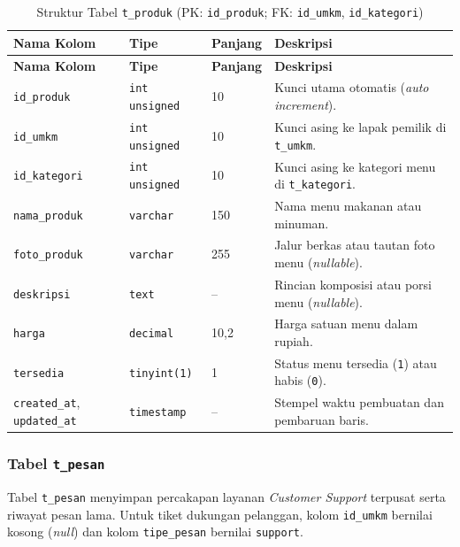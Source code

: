 \renewcommand{\arraystretch}{1.20}
\begin{longtable}{|L{3.85cm}|L{2.4cm}|C{1.65cm}|L{\dimexpr\textwidth-3.85cm-2.4cm-1.65cm-8\arrayrulewidth\relax}|}
\caption{Struktur Tabel \texttt{t\_produk} (PK: \texttt{id\_produk}; FK: \texttt{id\_umkm}, \texttt{id\_kategori})}
\label{tab:skema-produk} \\
\hline
{}
\textbf{Nama Kolom} & \textbf{Tipe} & \textbf{Panjang} & \textbf{Deskripsi} \\
\hline
\endfirsthead
\hline
{}
\textbf{Nama Kolom} & \textbf{Tipe} & \textbf{Panjang} & \textbf{Deskripsi} \\
\hline
\endhead
\hline
\endfoot
\texttt{id\_produk} & \texttt{int unsigned} & 10 & Kunci utama otomatis (\textit{auto increment}). \\
\hline
\texttt{id\_umkm} & \texttt{int unsigned} & 10 & Kunci asing ke lapak pemilik di \texttt{t\_umkm}. \\
\hline
\texttt{id\_kategori} & \texttt{int unsigned} & 10 & Kunci asing ke kategori menu di \texttt{t\_kategori}. \\
\hline
\texttt{nama\_produk} & \texttt{varchar} & 150 & Nama menu makanan atau minuman. \\
\hline
\texttt{foto\_produk} & \texttt{varchar} & 255 & Jalur berkas atau tautan foto menu (\textit{nullable}). \\
\hline
\texttt{deskripsi} & \texttt{text} & -- & Rincian komposisi atau porsi menu (\textit{nullable}). \\
\hline
\texttt{harga} & \texttt{decimal} & 10,2 & Harga satuan menu dalam rupiah. \\
\hline
\texttt{tersedia} & \texttt{tinyint(1)} & 1 & Status menu tersedia (\texttt{1}) atau habis (\texttt{0}). \\
\hline
\texttt{created\_at}, \texttt{updated\_at} & \texttt{timestamp} & -- & Stempel waktu pembuatan dan pembaruan baris. \\
\hline
\end{longtable}

\subsubsection{Tabel \texttt{t\_pesan}}
Tabel \texttt{t\_pesan} menyimpan percakapan layanan \textit{Customer Support} terpusat serta riwayat pesan lama. Untuk tiket dukungan pelanggan, kolom \texttt{id\_umkm} bernilai kosong (\textit{null}) dan kolom \texttt{tipe\_pesan} bernilai \texttt{support}.

